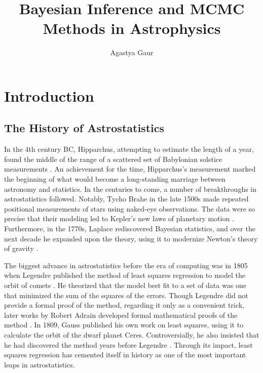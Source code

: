 \documentclass[preprint,longauthor]{aastex631}
\numberwithin{equation}{section}
\begin{document}
\label{placeholder} %

\title{Bayesian Inference and MCMC Methods in Astrophysics}
\author{Agastya Gaur}

\begin{abstract}
  \blindtext
\end{abstract}


\section{Introduction}
\label{sec:Introduction}
\subsection{The History of Astrostatistics}
In the 4th century BC, Hipparchus, attempting to estimate the length of a year, found the middle of the range of a scattered set of Babylonian solstice measurements \citep{feigelsonStatisticalChallengesModern2004}. An achievement for the time, Hipparchus's measurement marked the beginning of what would become a long-standing marriage between astronomy and statistics. In the centuries to come, a number of breakthroughs in astrostatistics followed. Notably, Tycho Brahe in the late 1500s made repeated positional measurements of stars using naked-eye observations. The data were so precise that their modeling led to Kepler's new laws of planetary motion \citep{leavesleyTychoBrahesWay2018}. Furthermore, in the 1770s, Laplace rediscovered Bayesian statistics, and over the next decade he expanded upon the theory, using it to modernize Newton's theory of gravity \citep{stiglerStudiesHistoryProbability1975}.

The biggest advance in astrostatistics before the era of computing was in 1805 when Legendre published the method of least squares regression to model the orbit of comets \citep{feigelsonStatisticalChallengesModern2004}. He theorized that the model best fit to a set of data was one that minimized the sum of the squares of the errors. Though Legendre did not provide a formal proof of the method, regarding it only as a convenient trick, later works by Robert Adrain developed formal mathematical proofs of the method \citep{merrimanHistoryMethodLeast1877}. In 1809, Gauss published his own work on least squares, using it to calculate the orbit of the dwarf planet Ceres. Controversially, he also insisted that he had discovered the method years before Legendre \citep{stiglerGaussInventionLeast1981}. Through its impact, least squares regression has cemented itself in history as one of the most important leaps in astrostatistics.
\end{document}
